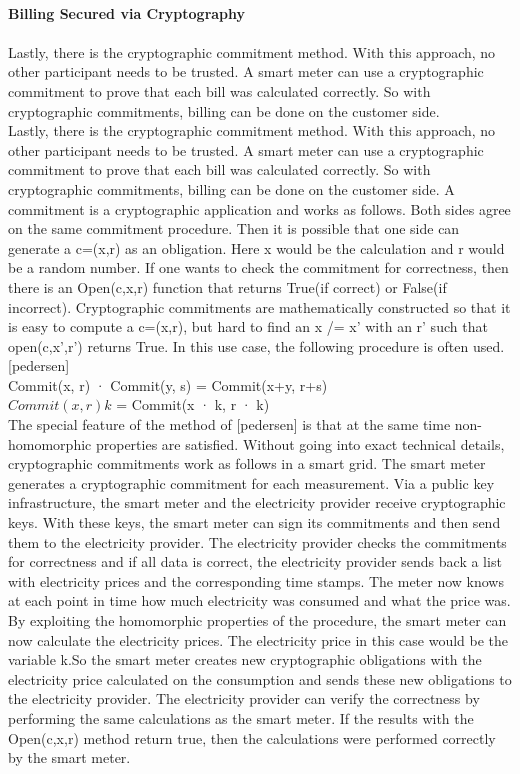 \\
\textbf{Billing Secured via Cryptography}
\\
\\
Lastly, there is the cryptographic commitment method.
With this approach, no other participant needs to be trusted. A smart meter can use a cryptographic commitment to prove that each bill was calculated correctly. So with cryptographic commitments, billing can be done on the customer side.\\
Lastly, there is the cryptographic commitment method.
With this approach, no other participant needs to be trusted. A smart meter can use a cryptographic commitment to prove that each bill was calculated correctly. So with cryptographic commitments, billing can be done on the customer side. A commitment is a cryptographic application and works as follows. Both sides agree on the same commitment procedure. Then it is possible that one side can generate a c=(x,r) as an obligation. Here x would be the calculation and r would be a random number. If one wants to check the commitment for correctness, then there is an Open(c,x,r) function that returns True(if correct) or False(if incorrect).
Cryptographic commitments are mathematically constructed so that it is easy to compute a c=(x,r), but hard to find an x /= x' with an r' such that open(c,x',r') returns True. In this use case, the following procedure is often used. [pedersen] \\
Commit(x, r) · Commit(y, s) = Commit(x+y, r+s)\\
$Commit(x, r){k}$ = Commit(x · k, r · k)\\
The special feature of the method of [pedersen] is that at the same time non-homomorphic properties are satisfied. Without going into exact technical details, cryptographic commitments work as follows in a smart grid.
The smart meter generates a cryptographic commitment for each measurement. Via a public key infrastructure, the smart meter and the electricity provider receive cryptographic keys. With these keys, the smart meter can sign its commitments and then send them to the electricity provider. The electricity provider checks the commitments for correctness and if all data is correct, the electricity provider sends back a list with electricity prices and the corresponding time stamps. The meter now knows at each point in time how much electricity was consumed and what the price was. By exploiting the homomorphic properties of the procedure, the smart meter can now calculate the electricity prices. The electricity price in this case would be the variable k.So the smart meter creates new cryptographic obligations with the electricity price calculated on the consumption and sends these new obligations to the electricity provider. The electricity provider can verify the correctness by performing the same calculations as the smart meter. If the results with the Open(c,x,r) method return true, then the calculations were performed correctly by the smart meter.
